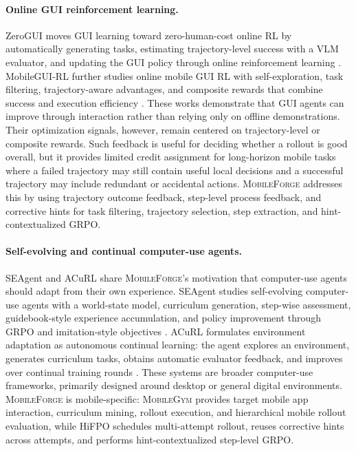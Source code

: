 \documentclass{llmxive}
\providecommand{\ourmethod}{\textsc{MobileForge}\xspace}
\providecommand{\mobilegym}{\textsc{MobileGym}\xspace}
\providecommand{\hifpo}{HiFPO\xspace}
\begin{document}
\paragraph{Online GUI reinforcement learning.}
ZeroGUI moves GUI learning toward zero-human-cost online RL by automatically generating tasks, estimating trajectory-level success with a VLM evaluator, and updating the GUI policy through online reinforcement learning \citep{yang2025zerogui}. MobileGUI-RL further studies online mobile GUI RL with self-exploration, task filtering, trajectory-aware advantages, and composite rewards that combine success and execution efficiency \citep{shi2025mobilegui}. These works demonstrate that GUI agents can improve through interaction rather than relying only on offline demonstrations. Their optimization signals, however, remain centered on trajectory-level or composite rewards. Such feedback is useful for deciding whether a rollout is good overall, but it provides limited credit assignment for long-horizon mobile tasks where a failed trajectory may still contain useful local decisions and a successful trajectory may include redundant or accidental actions. \ourmethod addresses this by using trajectory outcome feedback, step-level process feedback, and corrective hints for task filtering, trajectory selection, step extraction, and hint-contextualized GRPO.

\paragraph{Self-evolving and continual computer-use agents.}
SEAgent and ACuRL share \ourmethod's motivation that computer-use agents should adapt from their own experience. SEAgent studies self-evolving computer-use agents with a world-state model, curriculum generation, step-wise assessment, guidebook-style experience accumulation, and policy improvement through GRPO and imitation-style objectives \citep{sun2025seagent}. ACuRL formulates environment adaptation as autonomous continual learning: the agent explores an environment, generates curriculum tasks, obtains automatic evaluator feedback, and improves over continual training rounds \citep{xue2026acurl}. These systems are broader computer-use frameworks, primarily designed around desktop or general digital environments. \ourmethod is mobile-specific: \mobilegym provides target mobile app interaction, curriculum mining, rollout execution, and hierarchical mobile rollout evaluation, while \hifpo schedules multi-attempt rollout, reuses corrective hints across attempts, and performs hint-contextualized step-level GRPO.
\end{document}
